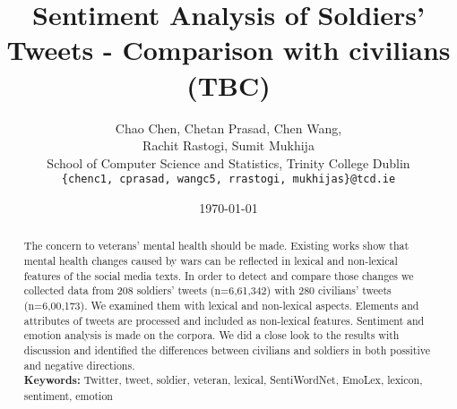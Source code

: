 \documentclass[english,a4paper,11pt]{article}
\title{Sentiment Analysis of Soldiers' Tweets - Comparison with civilians (TBC)}
\date{\today}
\author{
  Chao Chen, Chetan Prasad, Chen Wang, \\
  Rachit Rastogi, Sumit Mukhija \\
  School of Computer Science and Statistics, Trinity College Dublin\\
  \texttt{\{chenc1, cprasad, wangc5, rrastogi, mukhijas\}@tcd.ie}
}
\begin{document}
\maketitle
\thispagestyle{empty}
\pagestyle{empty}

\begin{abstract}
  The concern to veterans' mental health should be made. Existing works show that mental health changes caused by wars can be reflected in lexical and non-lexical features of the social media texts. In order to detect and compare those changes we collected data from 208 soldiers' tweets (n=6,61,342) with 280 civilians' tweets (n=6,00,173). We examined them with lexical and non-lexical aspects. Elements and attributes of tweets are processed and included as non-lexical features. Sentiment and emotion analysis is made on the corpora. We did a close look to the results with discussion and identified the differences between civilians and soldiers in both possitive and negative directions. \\
  \textbf{Keywords:} Twitter, tweet, soldier, veteran, lexical, SentiWordNet, EmoLex, lexicon, sentiment, emotion
\end{abstract}








\clearpage



\end{document}
